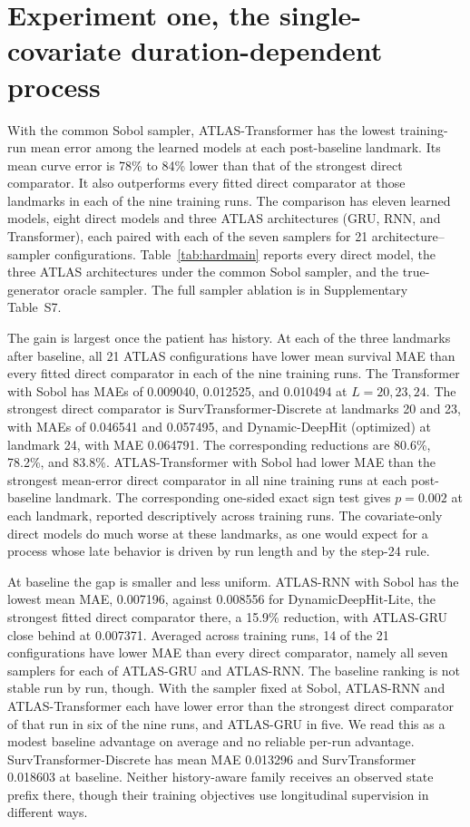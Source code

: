 \section{Experiment one, the single-covariate duration-dependent process}\label{sec:hardresults}
With the common Sobol sampler, ATLAS-Transformer has the lowest training-run mean error among the learned models at each post-baseline landmark. Its mean curve error is 78\% to 84\% lower than that of the strongest direct comparator. It also outperforms every fitted direct comparator at those landmarks in each of the nine training runs. The comparison has eleven learned models, eight direct models and three ATLAS architectures (GRU, RNN, and Transformer), each paired with each of the seven samplers for 21 architecture--sampler configurations. Table~\ref{tab:hardmain} reports every direct model, the three ATLAS architectures under the common Sobol sampler, and the true-generator oracle sampler. The full sampler ablation is in Supplementary Table~S7.



The gain is largest once the patient has history. At each of the three landmarks after baseline, all 21 ATLAS configurations have lower mean survival MAE than every fitted direct comparator in each of the nine training runs. The Transformer with Sobol has MAEs of 0.009040, 0.012525, and 0.010494 at $L=20,23,24$. The strongest direct comparator is SurvTransformer-Discrete at landmarks 20 and 23, with MAEs of 0.046541 and 0.057495, and Dynamic-DeepHit (optimized) at landmark 24, with MAE 0.064791. The corresponding reductions are 80.6\%, 78.2\%, and 83.8\%. ATLAS-Transformer with Sobol had lower MAE than the strongest mean-error direct comparator in all nine training runs at each post-baseline landmark. The corresponding one-sided exact sign test gives $p=0.002$ at each landmark, reported descriptively across training runs. The covariate-only direct models do much worse at these landmarks, as one would expect for a process whose late behavior is driven by run length and by the step-24 rule.

At baseline the gap is smaller and less uniform. ATLAS-RNN with Sobol has the lowest mean MAE, 0.007196, against 0.008556 for DynamicDeepHit-Lite, the strongest fitted direct comparator there, a 15.9\% reduction, with ATLAS-GRU close behind at 0.007371. Averaged across training runs, 14 of the 21 configurations have lower MAE than every direct comparator, namely all seven samplers for each of ATLAS-GRU and ATLAS-RNN. The baseline ranking is not stable run by run, though. With the sampler fixed at Sobol, ATLAS-RNN and ATLAS-Transformer each have lower error than the strongest direct comparator of that run in six of the nine runs, and ATLAS-GRU in five. We read this as a modest baseline advantage on average and no reliable per-run advantage. SurvTransformer-Discrete has mean MAE 0.013296 and SurvTransformer 0.018603 at baseline. Neither history-aware family receives an observed state prefix there, though their training objectives use longitudinal supervision in different ways.

